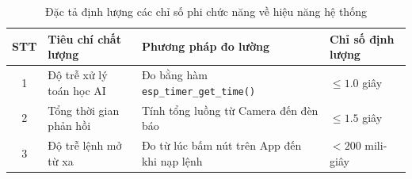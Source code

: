 \begin{table}[H]
    \caption{Đặc tả định lượng các chỉ số phi chức năng về hiệu năng hệ thống}
    \label{tab:non_functional_latency}
    \centering
    \small
    \renewcommand{\arraystretch}{1.4}
    \begin{tabularx}{\textwidth}{c l X l}
        \toprule
        \textbf{STT} & \textbf{Tiêu chí chất lượng} & \textbf{Phương pháp đo lường} & \textbf{Chỉ số định lượng} \\
        \midrule
        1 & Độ trễ xử lý toán học AI & Đo bằng hàm \texttt{esp\_timer\_get\_time()} & $\le 1.0$ giây \\
        \midrule
        2 & Tổng thời gian phản hồi & Tính tổng luồng từ Camera đến đèn báo & $\le 1.5$ giây \\
        \midrule
        3 & Độ trễ lệnh mở từ xa & Đo từ lúc bấm nút trên App đến khi nạp lệnh & $< 200$ mili-giây \\
        \bottomrule
    \end{tabularx}
\end{table}